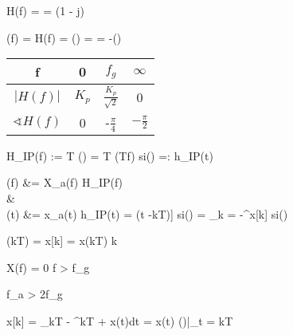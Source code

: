 \begin{abox}
	H(f) =  =  \cdot \left(1 - j\right)
\end{abox}

\begin{abox}
	\phi(f) = \sphericalangle H(f) = \arctan() = \arctan {} = -\arctan()
\end{abox}

\begin{abox}
	\begin{tabular}{c | c c c}
		f & 0 & $f_g$ & $\infty$\\\hline
		$\left|H(f)\right|$ & $K_p$ & $\frac{K_p}{\sqrt{2}}$ & 0\\
		$\sphericalangle H(f)$ & 0 & -$\frac{\pi}{4}$ & $-\frac{\pi}{2}$
	\end{tabular}
\end{abox}

\setcounter{BoxCounter}{340}

\begin{abox}
	H_{IP}(f) := T \cdot \rect() = T \cdot \rect(Tf) \sLaplace si(\pi{}) =: h_{IP}(t)
\end{abox}

\begin{abox}
	(f) &= X_a(f) \cdot H_{IP}(f)\\
	&\ztransrueck\\
	(t) &= x_a(t) \ast h_{IP}(t) = \left[\sum_{k = -\infty}^{\infty}x[k] \cdot \delta(t -kT)\right] \ast si(\pi{}) = \sum_{k = -\infty}^{\infty}x[k] \cdot si(\pi{})
\end{abox}

\begin{abox}
	(kT) = x[k] = x(kT) \quad\forall k\in{}
\end{abox}

\begin{abox}
	X(f) = 0  f > f_g
\end{abox}

\begin{abox}
	f_a > 2f_g
\end{abox}

\begin{abox}
	x[k] = \int_{kT - }^{kT + }x(t)dt = x(t) \ast {}\rect()|_{t = kT}
\end{abox}

